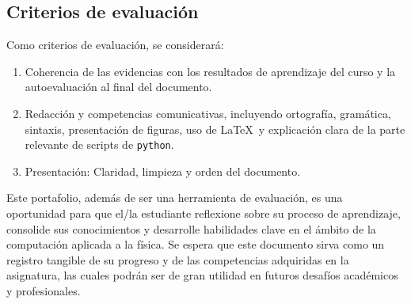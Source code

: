 \documentclass[../portafolio.tex]{subfiles}
\begin{document}
\subsection*{Criterios de evaluación}
Como criterios de evaluación, se considerará:
\begin{enumerate}
\item Coherencia de las evidencias con los resultados de aprendizaje del curso y la autoevaluación al final del documento.
\item Redacción y competencias comunicativas, incluyendo ortografía,
  gramática, sintaxis, presentación de figuras, uso de
  \LaTeX\ y explicación clara de la parte relevante de scripts de
  \texttt{python}.
\item Presentación: Claridad, limpieza y orden del documento.
\end{enumerate}

\medskip

Este portafolio, además de ser una herramienta de evaluación,
es una oportunidad para que el/la estudiante reflexione
sobre su proceso de aprendizaje, consolide sus conocimientos y
desarrolle habilidades clave en el ámbito de la computación aplicada a
la física. Se espera que este documento sirva como un registro
tangible de su progreso y de las competencias
adquiridas en la asignatura, las cuales podrán ser de gran
utilidad en futuros desafíos académicos y profesionales.
\end{document}
